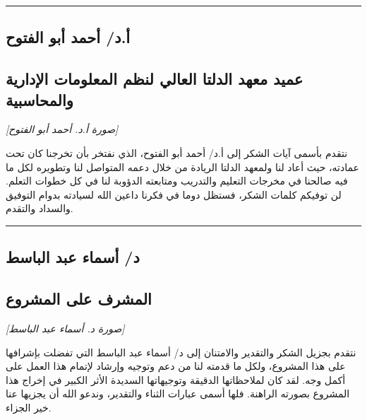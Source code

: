 \documentclass[12pt, a4paper]{report}
\begin{document}
\vspace{0.5cm}\hrule\vspace{0.5cm}
\newpage

\begin{center}

\section*{أ.د/ أحمد أبو الفتوح}
\subsection*{عميد معهد الدلتا العالي لنظم المعلومات الإدارية والمحاسبية}

\textit{[صورة أ.د. أحمد أبو الفتوح]} \\

\end{center}

نتقدم بأسمى آيات الشكر إلى أ.د/ أحمد أبو الفتوح، الذي نفتخر بأن تخرجنا كان تحت عمادته، حيث أعاد لنا ولمعهد الدلتا الريادة من خلال دعمه المتواصل لنا وتطويره لكل ما فيه صالحنا في مخرجات التعليم والتدريب ومتابعته الدؤوبة لنا في كل خطوات التعلم. لن توفيكم كلمات الشكر، فستظل دوما في فكرنا داعين الله لسيادته بدوام التوفيق والسداد والتقدم. \\

\vspace{0.5cm}\hrule\vspace{0.5cm}
\newpage

\begin{center}

\section*{د/ أسماء عبد الباسط}
\subsection*{المشرف على المشروع}

\textit{[صورة د. أسماء عبد الباسط]} \\

\end{center}

نتقدم بجزيل الشكر والتقدير والامتنان إلى د/ أسماء عبد الباسط التي تفضلت بإشرافها على هذا المشروع، ولكل ما قدمته لنا من دعم وتوجيه وإرشاد لإتمام هذا العمل على أكمل وجه. لقد كان لملاحظاتها الدقيقة وتوجيهاتها السديدة الأثر الكبير في إخراج هذا المشروع بصورته الراهنة. فلها أسمى عبارات الثناء والتقدير، وندعو الله أن يجزيها عنا خير الجزاء. \\
\end{document}
